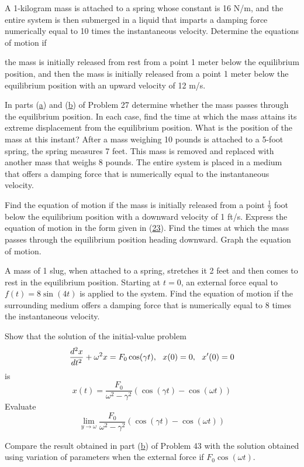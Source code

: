 \documentclass[chapter=5,section=1]{math252homework}
\begin{document}
\begin{problems}[start=3]
	\setcounter{problemsi}{26}
	\problem A 1-kilogram mass is attached to a spring whose constant is 16 N/m, and the entire system is then submerged in a liquid that imparts a damping force numerically equal to 10 times the instantaneous velocity. Determine the equations of motion if
	\begin{problems}
	    \subproblem the mass is initially released from rest from a point 1 meter below the equilibrium position, and then
		\subproblem the mass is initially released from a point 1 meter below the equilibrium position with an upward velocity of 12 m/s.
	\end{problems}
	\problem In parts (\hyperref[prb:27a]{a}) and (\hyperref[prb:27b]{b}) of Problem 27 determine whether the mass passes through the equilibrium position. In each case, find the time at which the mass attains its extreme displacement from the equilibrium position. What is the position of the mass at this instant?
	\setcounter{problemsi}{29}
	\problem After a mass weighing 10 pounds is attached to a 5-foot spring, the spring measures 7 feet. This mass is removed and replaced with another mass that weighs 8 pounds. The entire system is placed in a medium that offers a damping force that is numerically equal to the instantaneous velocity.
	\begin{problems}
	    \subproblem Find the equation of motion if the mass is initially released from a point $\frac{1}{2}$ foot below the equilibrium position with a downward velocity of 1 ft/s.
		\subproblem Express the equation of motion in the form given in (\hyperref[eq:23]{23}).
		\subproblem Find the times at which the mass passes through the equilibrium position heading downward.
		\subproblem Graph the equation of motion.
	\end{problems}
	\setcounter{problemsi}{34}
	\problem A mass of 1 slug, when attached to a spring, stretches it 2 feet and then comes to rest in the equilibrium position. Starting at $t=0$, an external force equal to $f(t)=8\sin(4t)$ is applied to the system. Find the equation of motion if the surrounding medium offers a damping force that is numerically equal to 8 times the instantaneous velocity.
	\setcounter{problemsi}{42}
	\problem 
	\begin{problems}
	    \subproblem Show that the solution of the initial-value problem \[ \frac{d^{2}x}{dt^{2}} + \omega^{2}x = F_{0}\cos(\gamma t),\mbox{{ }{ }} x(0)=0,\mbox{{ }{ }} x'(0)=0 \] is \[ x(t) = \frac{F_{0}}{\omega^{2} - \gamma^{2}}(\cos(\gamma t) - \cos(\omega t)) \]
		\subproblem Evaluate \[ \lim_{y\rightarrow \omega} \frac{F_{0}}{\omega^{2} - \gamma^{2}}(\cos(\gamma t) - \cos(\omega t)) \]
	\end{problems}
	\problem Compare the result obtained in part (\hyperref[prb:43b]{b}) of Problem 43 with the solution obtained using variation of parameters when the external force if $F_{0}\cos(\omega t)$.
\end{problems}
\end{document}
